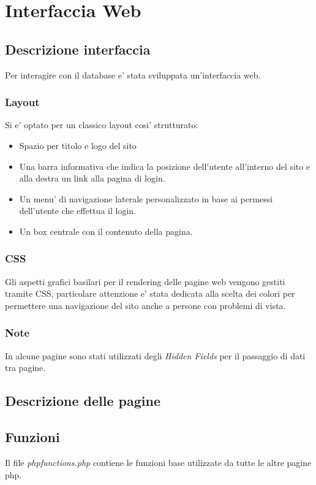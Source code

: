 \chapter{Interfaccia Web} 
 
\section{Descrizione interfaccia}

Per interagire con il database e' stata sviluppata un'interfaccia web.

\subsection{Layout}
Si e' optato per un classico layout cosi' strutturato:

\begin{itemize}
\item Spazio per titolo e logo del sito
\item Una barra informativa che indica la posizione dell'utente all'interno del sito e alla destra un link alla pagina di login.
\item Un menu' di navigazione laterale personalizzato in base ai permessi dell'utente che effettua il login.
\item Un box centrale con il contenuto della pagina.
\end{itemize}

\subsection{CSS}

Gli aspetti grafici basilari per il rendering delle pagine web vengono gestiti tramite CSS, particolare attenzione e' stata dedicata alla scelta dei colori per permettere una navigazione del sito anche a persone con problemi di vista.

\subsection{Note}
In alcune pagine sono stati utilizzati degli \textit{Hidden Fields} per il passaggio di dati tra pagine.

\section{Descrizione delle pagine}

\section{Funzioni}
Il file \textit{phpfunctions.php} contiene le funzioni base utilizzate da tutte le altre pagine php.


